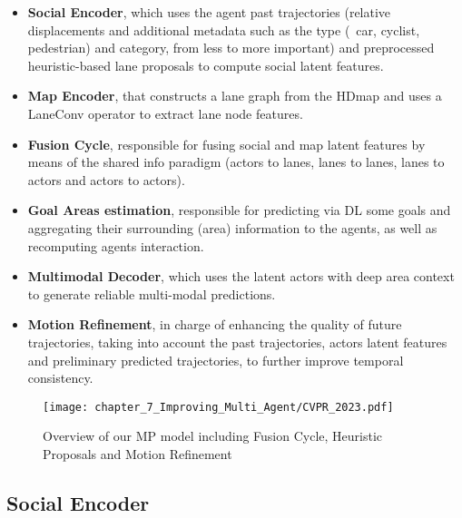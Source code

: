 \begin{itemize}
	
	\item \textbf{Social Encoder}, which uses the agent past trajectories (relative displacements and additional metadata such as the type (\eg \ car, cyclist, pedestrian) and category, from less to more important) and preprocessed heuristic-based lane proposals to compute social latent features.
	
	\item \textbf{Map Encoder}, that constructs a lane graph from the \ac{HDmap} and uses a LaneConv operator \cite{liang2020learning} to extract lane node features.
	
	\item \textbf{Fusion Cycle}, responsible for fusing social and map latent features by means of the shared info paradigm (actors to lanes, lanes to lanes, lanes to actors and actors to actors).
	
	\item \textbf{Goal Areas estimation}, responsible for predicting via \ac{DL} some goals and aggregating their surrounding (area) information to the agents, as well as recomputing agents interaction. 
	
	\item \textbf{Multimodal Decoder}, which uses the latent actors with deep area context to generate reliable multi-modal predictions.
	
	\item \textbf{Motion Refinement}, in charge of enhancing the quality of future trajectories, taking into account the past trajectories, actors latent features and preliminary predicted trajectories, to further improve temporal consistency.
	
\end{itemize}

\begin{figure}[h] 
	\centering
	\texttt{[image: chapter\_7\_Improving\_Multi\_Agent/CVPR\_2023.pdf]}
	\caption{Overview of our \ac{MP} model including Fusion Cycle, Heuristic Proposals and Motion Refinement}
	\label{fig:chapter_7_Improving_Multi_Agent/CVPR_2023}
\end{figure}

\subsection{Social Encoder}
\label{subsubsec:7_improving_efficiency_social_encoder}

